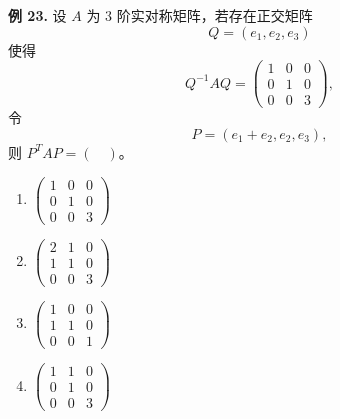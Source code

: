 \begin{problemblock}
\textbf{例 23.} 设 \(A\) 为 \(3\) 阶实对称矩阵，若存在正交矩阵
\[
Q=(e_1,e_2,e_3)
\]
使得
\[
Q^{-1}AQ=
\begin{pmatrix}
1&0&0\\
0&1&0\\
0&0&3
\end{pmatrix},
\]
令
\[
P=(e_1+e_2,e_2,e_3),
\]
则 \(P^TAP=(\quad)\)。

\begin{enumerate}[label=\Alph*.]
\item \(\begin{pmatrix}1&0&0\\0&1&0\\0&0&3\end{pmatrix}\)
\item \(\begin{pmatrix}2&1&0\\1&1&0\\0&0&3\end{pmatrix}\)
\item \(\begin{pmatrix}1&0&0\\1&1&0\\0&0&1\end{pmatrix}\)
\item \(\begin{pmatrix}1&1&0\\0&1&0\\0&0&3\end{pmatrix}\)
\end{enumerate}
\end{problemblock}
\begin{solutionblock}
\end{solutionblock}

